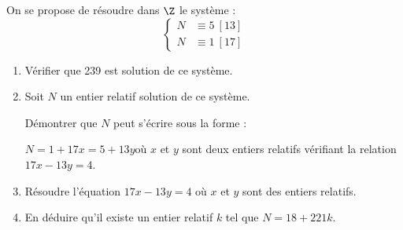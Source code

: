 \documentclass{cornouaille}
\begin{document}
\begin{exercice}

On se propose de résoudre dans $\Z$ le système : 
$$\left\{\begin{aligned}
N&\equiv5\ [13]\\
N&\equiv 1\ [17]
\end{aligned}\right.$$

\begin{enumerate}
\item Vérifier que 239 est solution de ce système.
\item Soit $N$ un entier relatif solution de ce système.
		
Démontrer que $N$ peut s'écrire sous la forme : 

$N= 1 + 17x = 5 + 13y$\enskip où $x$ et $y$ sont deux entiers relatifs vérifiant la relation $17x - 13y = 4$.
\item Résoudre l'équation $17x - 13y = 4$ où $x$ et $y$ sont des entiers relatifs.
\item En déduire qu'il existe un entier relatif  $k$ tel que $N = 18 + 221k$.
\end{enumerate}
\end{exercice}

\end{document}

